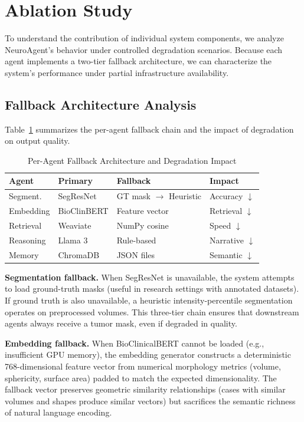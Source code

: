 \section{Ablation Study}

To understand the contribution of individual system components, we analyze NeuroAgent's behavior under controlled degradation scenarios. Because each agent implements a two-tier fallback architecture, we can characterize the system's performance under partial infrastructure availability.

\subsection{Fallback Architecture Analysis}

Table~\ref{tab:fallback} summarizes the per-agent fallback chain and the impact of degradation on output quality.

\begin{table}[t]
\centering
\caption{Per-Agent Fallback Architecture and Degradation Impact}
\label{tab:fallback}
\begin{tabular}{p{1.7cm}p{2.2cm}p{1.9cm}p{1.6cm}}
\hline
\textbf{Agent} & \textbf{Primary} & \textbf{Fallback} & \textbf{Impact} \\
\hline
Segment. & SegResNet & GT mask $\to$ Heuristic & Accuracy $\downarrow$ \\
Embedding & BioClinBERT & Feature vector & Retrieval $\downarrow$ \\
Retrieval & Weaviate & NumPy cosine & Speed $\downarrow$ \\
Reasoning & Llama 3 & Rule-based & Narrative $\downarrow$ \\
Memory & ChromaDB & JSON files & Semantic $\downarrow$ \\
\hline
\end{tabular}
\end{table}

\textbf{Segmentation fallback.} When SegResNet is unavailable, the system attempts to load ground-truth masks (useful in research settings with annotated datasets). If ground truth is also unavailable, a heuristic intensity-percentile segmentation operates on preprocessed volumes. This three-tier chain ensures that downstream agents always receive a tumor mask, even if degraded in quality.

\textbf{Embedding fallback.} When BioClinicalBERT cannot be loaded (e.g., insufficient GPU memory), the embedding generator constructs a deterministic 768-dimensional feature vector from numerical morphology metrics (volume, sphericity, surface area) padded to match the expected dimensionality. The fallback vector preserves geometric similarity relationships (cases with similar volumes and shapes produce similar vectors) but sacrifices the semantic richness of natural language encoding.

